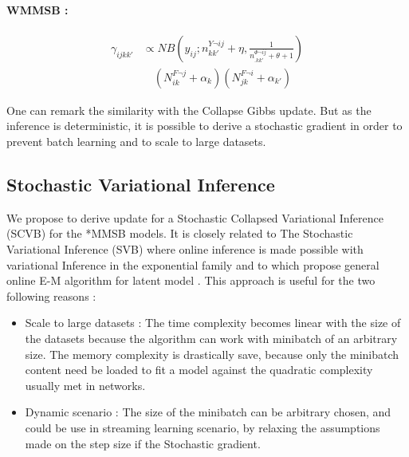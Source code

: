\paragraph{WMMSB :}
\begin{align*}
\gamma_{ijkk'} &\propto NB(y_{ij}; n^{Y\neg ij}_{kk'} + \eta, \frac{1}{n^{\Phi\neg ij}_{\bm{.}kk'} + \theta + 1} ) \\
&\quad (N^{F\neg j}_{ik} + \alpha_k) (N^{F\neg i}_{jk} + \alpha_{k'}) 
\end{align*}

%


One can remark the similarity with the Collapse Gibbs update. But as the inference is deterministic, it is possible to derive a stochastic gradient in order to prevent batch learning and to scale to large datasets.

\subsection{Stochastic Variational Inference}

We propose to derive update for a Stochastic Collapsed Variational Inference (SCVB) for the *MMSB models. It is closely related to The Stochastic Variational Inference (SVB)  where online inference is made possible with variational Inference in the exponential family and to \cite{hoffman2013stochastic} which propose general online E-M algorithm for latent model \cite{cappe2009line}. This approach is useful for the two following reasons :

\begin{itemize}
    \item Scale to large datasets : The time complexity becomes linear with the size of the datasets because the algorithm can work with minibatch of an arbitrary size. The memory complexity is drastically save, because only the minibatch content need be loaded to fit a model against the quadratic complexity usually met in networks.
    \item Dynamic scenario : The size of the minibatch can be arbitrary chosen, and could be use in streaming learning scenario, by relaxing the assumptions made on the step size if the Stochastic gradient.
\end{itemize}


